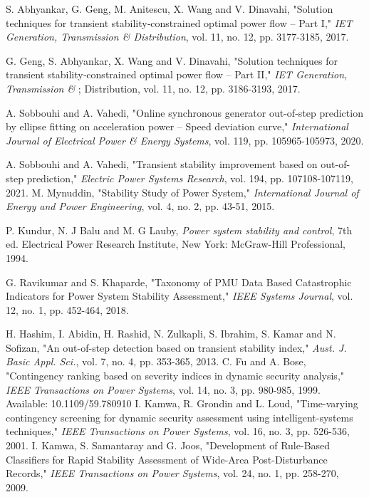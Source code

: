 \begin{thebibliography}{99}
\begin{singlespace}

 S. Abhyankar, G. Geng, M. Anitescu, X. Wang and V. Dinavahi, "Solution techniques for transient stability‐constrained optimal power flow – Part I," \textit{IET Generation, Transmission \& Distribution}, vol. 11, no. 12, pp. 3177-3185, 2017.

 G. Geng, S. Abhyankar, X. Wang and V. Dinavahi, "Solution techniques for transient stability‐constrained optimal power flow – Part II," \textit{IET Generation, Transmission \& }; Distribution, vol. 11, no. 12, pp. 3186-3193, 2017.

 A. Sobbouhi and A. Vahedi, "Online synchronous generator out-of-step prediction by ellipse fitting on acceleration power – Speed deviation curve," \textit{International Journal of Electrical Power \& Energy Systems}, vol. 119, pp. 105965-105973, 2020.

 A. Sobbouhi and A. Vahedi, "Transient stability improvement based on out-of-step prediction," \textit{Electric Power Systems Research}, vol. 194, pp. 107108-107119, 2021.
 M. Mynuddin, "Stability Study of Power System," \textit{International Journal of Energy and Power Engineering}, vol. 4, no. 2, pp. 43-51, 2015.

 P. Kundur, N. J Balu and M. G Lauby, \textit{Power system stability and control}, 7th ed. Electrical Power Research Institute, New York: McGraw-Hill Professional, 1994.

 G. Ravikumar and S. Khaparde, "Taxonomy of PMU Data Based Catastrophic Indicators for Power System Stability Assessment," \textit{IEEE Systems Journal}, vol. 12, no. 1, pp. 452-464, 2018.

 H. Hashim, I. Abidin, H. Rashid, N. Zulkapli, S. Ibrahim, S. Kamar and N. Sofizan, "An out-of-step detection based on transient stability index," \textit{Aust. J. Basic Appl. Sci.}, vol. 7, no. 4, pp. 353-365, 2013.
%
 C. Fu and A. Bose, "Contingency ranking based on severity indices in dynamic security analysis," \textit{IEEE Transactions on Power Systems}, vol. 14, no. 3, pp. 980-985, 1999. Available: 10.1109/59.780910
%
 I. Kamwa, R. Grondin and L. Loud, "Time-varying contingency screening for dynamic security assessment using intelligent-systems techniques," \textit{IEEE Transactions on Power Systems}, vol. 16, no. 3, pp. 526-536, 2001.
%
 I. Kamwa, S. Samantaray and G. Joos, "Development of Rule-Based Classifiers for Rapid Stability Assessment of Wide-Area Post-Disturbance Records," \textit{IEEE Transactions on Power Systems}, vol. 24, no. 1, pp. 258-270, 2009.


\end{singlespace}
\end{thebibliography}
